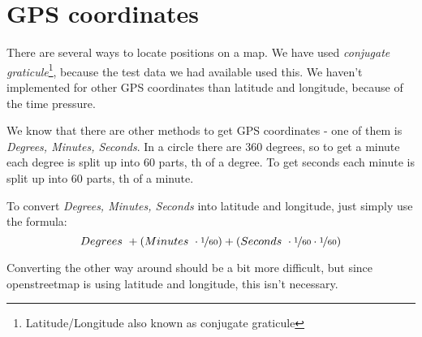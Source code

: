 \section{GPS coordinates}
There are several ways to locate positions on a map. We have used \emph{conjugate graticule}\footnote{Latitude/Longitude also known as conjugate graticule}, because the test data we had available used this. We haven't implemented for other GPS coordinates than latitude and longitude, because of the time pressure.

We know that there are other methods to get GPS coordinates - one of them is \emph{Degrees, Minutes, Seconds}. In a circle there are 360 degrees, so to get a minute each degree is split up into 60 parts, th of a degree. To get seconds each minute is split up into 60 parts, th of a minute.

To convert \emph{Degrees, Minutes, Seconds} into latitude and longitude, just simply use the formula:
\begin{equation}
Degrees~ + \left(Minutes~ \cdot \nicefrac{1}{60}\right) + \left(Seconds~ \cdot \nicefrac{1}{60} \cdot \nicefrac{1}{60}\right)
\end{equation}

Converting the other way around should be a bit more difficult, but since openstreetmap is using latitude and longitude, this isn't necessary.